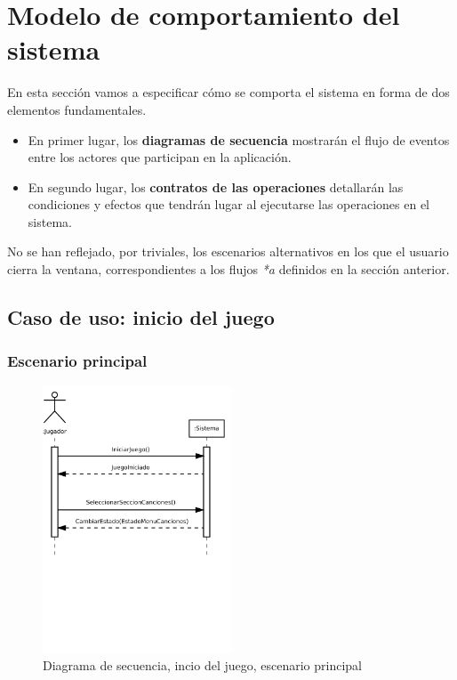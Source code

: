 
\section{Modelo de comportamiento del sistema}
En esta sección vamos a especificar cómo se comporta el sistema en forma de dos
elementos fundamentales.
\begin{itemize}
\item En primer lugar, los \textbf{diagramas de secuencia} mostrarán el flujo de
  eventos entre los actores que participan en la aplicación.
\item En segundo lugar, los \textbf{contratos de las operaciones} detallarán las
  condiciones y efectos que tendrán lugar al ejecutarse las operaciones en el
  sistema.
\end{itemize}

\begin{nota}
  No se han reflejado, por triviales, los escenarios alternativos en los que el
  usuario cierra la ventana, correspondientes a los flujos \textit{*a} definidos
  en la sección anterior.
\end{nota}

\subsection{Caso de uso: inicio del juego}

\subsubsection{Escenario principal}

\begin{figure}[h!]
  \centering
  \includegraphics[trim=0cm 12cm 0cm 0cm, clip=true, width=0.5\textwidth]{4_analisis/diagsec_caso1_esc1}
  \caption{Diagrama de secuencia, incio del juego, escenario principal}
\end{figure}

